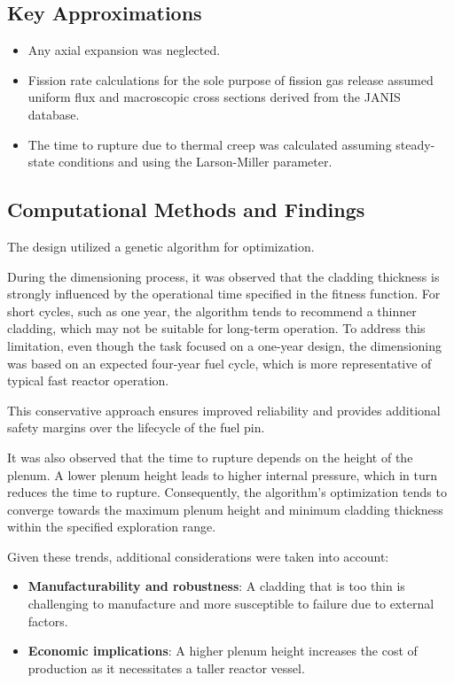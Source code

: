 \documentclass[11pt,a4paper,twoside]{article}
\begin{document}
\subsection{Key Approximations}
\begin{itemize}
    \item Any axial expansion was neglected.
    \item Fission rate calculations for the sole purpose of fission gas release assumed uniform flux and macroscopic cross sections derived from the JANIS database.
    \item The time to rupture due to thermal creep was calculated assuming steady-state conditions and using the Larson-Miller parameter.
\end{itemize}

\subsection{Computational Methods and Findings}
The design utilized a genetic algorithm for optimization.

During the dimensioning process, it was observed that the cladding thickness is strongly influenced by the operational time specified in the fitness function. For short cycles, such as one year, the algorithm tends to recommend a thinner cladding, which may not be suitable for long-term operation. To address this limitation, even though the task focused on a one-year design, the dimensioning was based on an expected four-year fuel cycle, which is more representative of typical fast reactor operation.

This conservative approach ensures improved reliability and provides additional safety margins over the lifecycle of the fuel pin.

It was also observed that the time to rupture depends on the height of the plenum. A lower plenum height leads to higher internal pressure, which in turn reduces the time to rupture. Consequently, the algorithm’s optimization tends to converge towards the maximum plenum height and minimum cladding thickness within the specified exploration range.

Given these trends, additional considerations were taken into account:
\begin{itemize}
    \item \textbf{Manufacturability and robustness}: A cladding that is too thin is challenging to manufacture and more susceptible to failure due to external factors.
    \item \textbf{Economic implications}: A higher plenum height increases the cost of production as it necessitates a taller reactor vessel.
\end{itemize}
\end{document}
